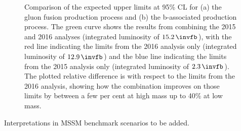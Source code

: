 \begin{figure}[h!]
\begin{center}
\end{center}
\caption[Comparison of the expected upper limits at 95\% CL for the 
gluon fusion and b-associated production process, comparing the 2015 and 2016 analyses with a combination.]{Comparison of the expected upper limits at 95\% \ac{CL} for (a) the gluon fusion production
process and (b) the b-associated production process. The green curve shows the results
from combining the 2015 and 2016 analyses (integrated luminosity of $15.2\,\invfb$),
with the red line indicating the limits from the 2016 analysis only (integrated luminosity of $12.9\,\invfb$)
and the blue line indicating the limits from the 2015 analysis only (integrated luminosity of $2.3\,\invfb$).
The plotted relative difference is with respect to the limits from the 2016 analysis, showing how the combination
improves on those limits by between a few per cent at high mass up to 40\% at low mass.}
\label{fig:mssm_results_combination_limits_comp}
\end{figure}

Interpretations in MSSM benchmark scenarios to be added.




